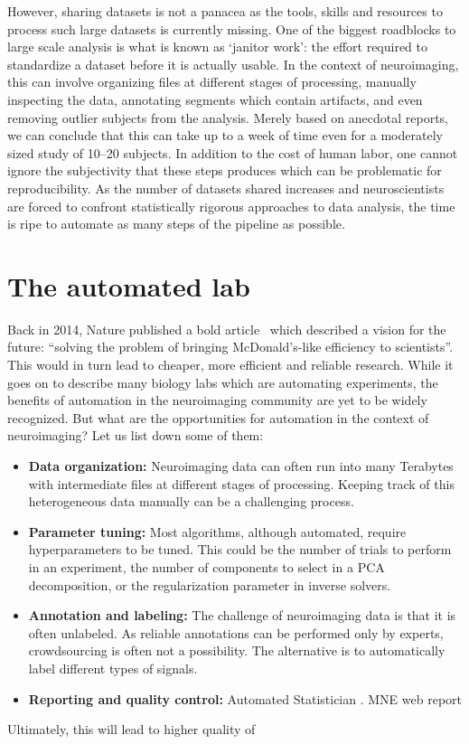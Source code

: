 However, sharing datasets is not a panacea as the tools, skills and resources to process such large datasets is currently missing. One of the biggest roadblocks to large scale analysis is what is known as `janitor work': the effort required to standardize a dataset before it is actually usable. In the context of neuroimaging, this can involve organizing files at different stages of processing, manually inspecting the data, annotating segments which contain artifacts, and even removing outlier subjects from the analysis. Merely based on anecdotal reports, we can conclude that this can take up to a week of time even for a moderately sized study of 10--20 subjects.
In addition to the cost of human labor, one cannot ignore the subjectivity that these steps produces which can be problematic for reproducibility. As the number of datasets shared increases and neuroscientists are forced to confront statistically rigorous approaches to data analysis, the time is ripe to automate as many steps of the pipeline as possible.

\section{The automated lab}
Back in 2014, Nature published a bold article~\citep{hayden2014automated} which described a vision for the future: ``solving the problem of bringing McDonald's-like efficiency to scientists''. This would in turn lead to cheaper, more efficient and reliable research. While it goes on to describe many biology labs which are automating experiments, the benefits of automation in the neuroimaging community are yet to be widely recognized. But what are the opportunities for automation in the context of neuroimaging? Let us list down some of them:
\begin{itemize}[noitemsep,nolistsep,nosep]
\item \textbf{Data organization:} Neuroimaging data can often run into many Terabytes with intermediate files at different stages of processing. Keeping track of this heterogeneous data manually can be a challenging process.
\item \textbf{Parameter tuning:} Most algorithms, although automated, require hyperparameters to be tuned. This could be the number of trials to perform in an experiment, the number of components to select in a \ac{PCA} decomposition, or the regularization parameter in inverse solvers.
\item \textbf{Annotation and labeling:} The challenge of neuroimaging data is that it is often unlabeled. As reliable annotations can be performed only by experts, crowdsourcing is often not a possibility. The alternative is to automatically label different types of signals.
\item \textbf{Reporting and quality control:} Automated Statistician . \ac{MNE} web report
\end{itemize}
Ultimately, this will lead to higher quality of 


